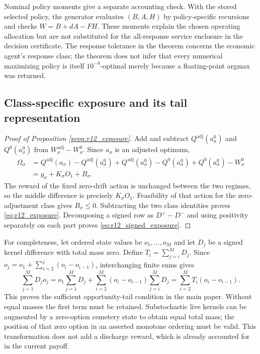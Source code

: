 Nominal policy moments give a separate accounting check. With the stored selected policy, the generator evaluates $(B,A,H)$ by policy-specific recursions and checks $W=B+dA-FH$. These moments explain the chosen operating allocation but are not substituted for the all-response service enclosure in the decision certificate. The response tolerance in the theorem concerns the economic agent's response class; the theorem does not infer that every numerical maximizing policy is itself $10^{-8}$-optimal merely because a floating-point argmax was returned.

\subsection{Class-specific exposure and its tail representation}
\begin{proof}[Proof of Proposition \ref{prop:r12_exposure}]
Add and subtract $Q^{\mathrm{adj}}(a_\sigma^0)$ and $Q^0(a_\sigma^0)$ from $W^{\mathrm{adj}}_\sigma-W^0_\sigma$. Since $a_\sigma$ is an adjusted optimum,
\begin{align}
\Omega_\sigma
 &=Q^{\mathrm{adj}}(a_\sigma)-Q^{\mathrm{adj}}(a_\sigma^0)
   +Q^{\mathrm{adj}}(a_\sigma^0)-Q^0(a_\sigma^0)
   +Q^0(a_\sigma^0)-W^0_\sigma\\
 &=g_\sigma+K_\sigma O_1+B_\sigma.
\end{align}
The reward of the fixed zero-drift action is unchanged between the two regimes, so the middle difference is precisely $K_\sigma O_1$. Feasibility of that action for the zero-adjustment class gives $B_\sigma\leq0$. Subtracting the two class identities proves \eqref{eq:r12_exposure}. Decomposing a signed row as $D^+-D^-$ and using positivity separately on each part proves \eqref{eq:r12_signed_exposure}.
\end{proof}

For completeness, let ordered state values be $o_1,\ldots,o_M$ and let $D_j$ be a signed kernel difference with total mass zero. Define $T_i=\sum_{j=i}^M D_j$. Since
$o_j=o_1+\sum_{i=2}^j(o_i-o_{i-1})$, interchanging finite sums gives
\begin{equation}
 \sum_{j=1}^M D_jo_j
 =o_1\sum_{j=1}^M D_j+\sum_{i=2}^M(o_i-o_{i-1})\sum_{j=i}^M D_j
 =\sum_{i=2}^M T_i(o_i-o_{i-1}).
\end{equation}
This proves the sufficient opportunity-tail condition in the main paper. Without equal masses the first term must be retained. Substochastic live kernels can be augmented by a zero-option cemetery state to obtain equal total mass; the position of that zero option in an asserted monotone ordering must be valid. This transformation does not add a discharge reward, which is already accounted for in the current payoff.

